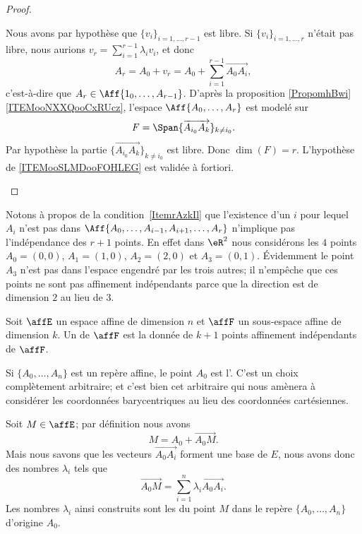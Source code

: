 \begin{proof}
\begin{subproof}
		Nous avons par hypothèse que \( \{ v_i \}_{i=1,\ldots,r-1}\) est libre. Si \( \{ v_i \}_{i=1,\ldots,r}\) n'était pas libre, nous aurions \( v_r=\sum_{i=1}^{r-1}\lambda_iv_i \), et donc
		\begin{equation}
			A_r=A_0+v_r=A_0+\sum_{i=1}^{r-1}\overrightarrow{A_0A_i},
		\end{equation}
		c'est-à-dire que \( A_r\in \Aff\{ 1_0,\ldots,A_{r-1} \}\).
		D'après la proposition \ref{PropomhBwi}\ref{ITEMooNXXQooCxRUcz}, l'espace \( \Aff\{ A_0,\ldots,A_r \}\) est modelé sur
		\begin{equation}
			F=\Span\{ \overrightarrow{A_{i_0}A_k} \}_{k\neq i_0}.
		\end{equation}
		Par hypothèse la partie \( \{ \overrightarrow{A_{i_0}A_k} \}_{k\neq i_0}\) est libre. Donc \( \dim(F)=r\).
		L'hypothèse de \ref{ITEMooSLMDooFOHLEG} est validée à fortiori.
	\end{subproof}
\end{proof}

Notons à propos de la condition~\ref{ItemrAzkIl} que l'existence d'un \( i\) pour lequel \( A_i\) n'est pas dans \(\Aff\{ A_0,\ldots, A_{i-1},A_{i+1},\ldots, A_r \}\) n'implique pas l'indépendance des \( r+1\) points. En effet dans \( \eR^2\) nous considérons les \( 4\) points \( A_0=(0,0)\), \( A_1=(1,0)\), \( A_2=(2,0)\) et \( A_3=(0,1)\). Évidemment le point \( A_3\) n'est pas dans l'espace engendré par les trois autres; il n'empêche que ces points ne sont pas affinement indépendants parce que la direction est de dimension \( 2\) au lieu de \( 3\).

\begin{definition}  \label{DefguuwEO}
	Soit \( \affE\) un espace affine de dimension \( n\) et \( \affF\) un sous-espace affine de dimension \( k\). Un  de \( \affF\) est la donnée de \( k+1\) points affinement indépendants de \( \affF\).
\end{definition}
Si \( \{ A_0,\ldots, A_n \}\) est un repère affine, le point \( A_0\) est l'. C'est un choix complètement arbitraire; et c'est bien cet arbitraire qui nous amènera à considérer les coordonnées barycentriques au lieu des coordonnées cartésiennes.

Soit \( M\in \affE\); par définition nous avons
\begin{equation}
	M=A_0+\overrightarrow{ A_0M }.
\end{equation}
Mais nous savons que les vecteurs \( \overrightarrow{ A_0A_i }\) forment une base de \( E\), nous avons donc des nombres \( \lambda_i\) tels que
\begin{equation}
	\overrightarrow{ A_0M }=\sum_{i=1}^n\lambda_i\overrightarrow{ A_0A_i }.
\end{equation}
Les nombres \( \lambda_i\) ainsi construits sont les  du point \( M\) dans le repère \( \{ A_0,\ldots, A_n \}\) d'origine \( A_0\).

